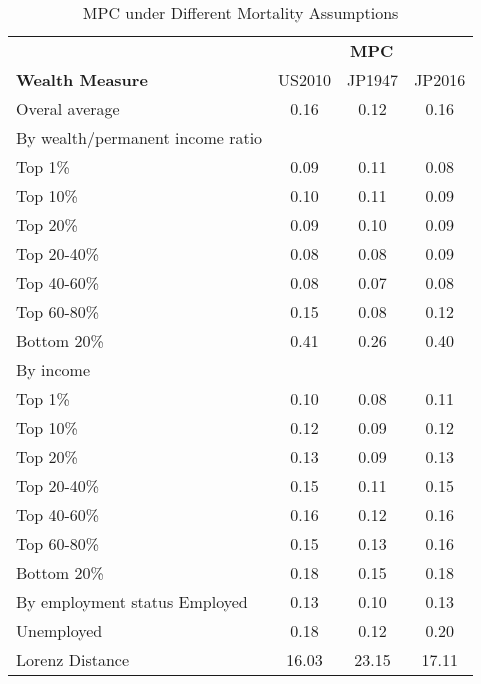 \documentclass[11pt]{article} %
\begin{document}
\begin{table} 
\centering 
\caption{MPC under Different Mortality Assumptions} %
\begin{tabular}{l c c c} %
\toprule %
& \multicolumn{3}{c}{\textbf{MPC}} \\ %
\cmidrule(l){2-4} %
\textbf{Wealth Measure} & US2010 & JP1947 & JP2016 \\ %
\midrule %
Overal average & 0.16  & 0.12 & 0.16  \\ 
\midrule %
By wealth/permanent income ratio \\ 
 Top 1\% & 0.09 & 0.11 & 0.08 \\ 
 Top 10\% & 0.10 & 0.11 & 0.09 \\ 
 Top 20\% & 0.09 & 0.10 & 0.09 \\ 
 Top 20-40\% & 0.08 & 0.08 & 0.09 \\ 
 Top 40-60\% & 0.08 & 0.07 & 0.08 \\ 
 Top 60-80\% & 0.15 & 0.08 & 0.12 \\ 
 Bottom 20\% & 0.41 & 0.26 & 0.40 \\ 
\midrule %
By income \\ 
 Top 1\% & 0.10 & 0.08 & 0.11 \\ 
 Top 10\% & 0.12 & 0.09 & 0.12 \\ 
 Top 20\% & 0.13 & 0.09 & 0.13 \\ 
 Top 20-40\% & 0.15 & 0.11 & 0.15 \\ 
 Top 40-60\% & 0.16 & 0.12 & 0.16 \\ 
 Top 60-80\% & 0.15 & 0.13 & 0.16 \\ 
 Bottom 20\% & 0.18 & 0.15 & 0.18 \\ 
\midrule %
By employment status
 Employed & 0.13 & 0.10 & 0.13  \\ 
 Unemployed & 0.18 & 0.12 & 0.20 \\ 
\midrule %
 Lorenz Distance & 16.03 & 23.15 & 17.11  \\ 
\bottomrule %
\end{tabular}

\label{tab:template} %
\end{table}
\end{document}
